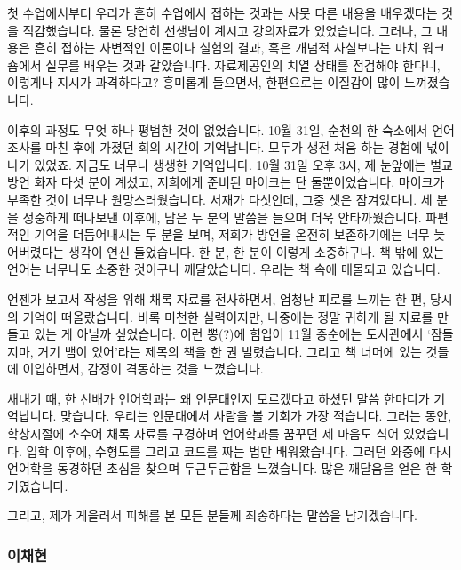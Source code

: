 첫 수업에서부터 우리가 흔히 수업에서 접하는 것과는 사뭇 다른 내용을 배우겠다는 것을 직감했습니다. 물론 당연히 선생님이 계시고 강의자료가 있었습니다. 그러나, 그 내용은 흔히 접하는 사변적인 이론이나 실험의 결과, 혹은 개념적 사실보다는 마치 워크숍에서 실무를 배우는 것과 같았습니다. 자료제공인의 치열 상태를 점검해야 한다니, 이렇게나 지시가 과격하다고? 흥미롭게 들으면서, 한편으로는 이질감이 많이 느껴졌습니다.

이후의 과정도 무엇 하나 평범한 것이 없었습니다. 10월 31일, 순천의 한 숙소에서 언어조사를 마친 후에 가졌던 회의 시간이 기억납니다. 모두가 생전 처음 하는 경험에 넋이 나가 있었죠. 지금도 너무나 생생한 기억입니다. 10월 31일 오후 3시, 제 눈앞에는 벌교 방언 화자 다섯 분이 계셨고, 저희에게 준비된 마이크는 단 둘뿐이었습니다. 마이크가 부족한 것이 너무나 원망스러웠습니다. 서재가 다섯인데, 그중 셋은 잠겨있다니. 세 분을 정중하게 떠나보낸 이후에, 남은 두 분의 말씀을 들으며 더욱 안타까웠습니다. 파편적인 기억을 더듬어내시는 두 분을 보며, 저희가 방언을 온전히 보존하기에는 너무 늦어버렸다는 생각이 연신 들었습니다. 한 분, 한 분이 이렇게 소중하구나. 책 밖에 있는 언어는 너무나도 소중한 것이구나 깨달았습니다. 우리는 책 속에 매몰되고 있습니다.

언젠가 보고서 작성을 위해 채록 자료를 전사하면서, 엄청난 피로를 느끼는 한 편, 당시의 기억이 떠올랐습니다. 비록 미천한 실력이지만, 나중에는 정말 귀하게 될 자료를 만들고 있는 게 아닐까 싶었습니다. 이런 뽕(?)에 힘입어 11월 중순에는 도서관에서 `잠들지마, 거기 뱀이 있어'라는 제목의 책을 한 권 빌렸습니다. 그리고 책 너머에 있는 것들에 이입하면서, 감정이 격동하는 것을 느꼈습니다.

새내기 때, 한 선배가 언어학과는 왜 인문대인지 모르겠다고 하셨던 말씀 한마디가 기억납니다. 맞습니다. 우리는 인문대에서 사람을 볼 기회가 가장 적습니다. 그러는 동안, 학창시절에 소수어 채록 자료를 구경하며 언어학과를 꿈꾸던 제 마음도 식어 있었습니다. 입학 이후에, 수형도를 그리고 코드를 짜는 법만 배워왔습니다. 그러던 와중에 다시 언어학을 동경하던 초심을 찾으며 두근두근함을 느꼈습니다. 많은 깨달음을 얻은 한 학기였습니다.

\bigskip

그리고, 제가 게을러서 피해를 본 모든 분들께 죄송하다는 말씀을 남기겠습니다.

\subsubsection{이채현}

